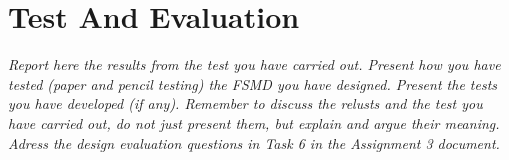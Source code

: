\documentclass[a4paper, english]{article}
\numberwithin{equation}{section}
\begin{document}
\section{Test And Evaluation}
\textit{Report here the results from the test you have carried out. Present how you have tested (paper and pencil testing) the FSMD you have designed. Present the tests you have developed (if any). Remember to discuss the relusts and the test you have carried out, do not just present them, but explain and argue their meaning. Adress the design evaluation questions in Task 6 in the Assignment 3 document.}

%
%




%
\end{document}
